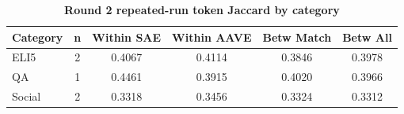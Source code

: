 \begin{table}[htbp]
\centering
\caption{\textbf{Round 2 repeated-run token Jaccard by category}}
\label{tab:round2-repeated-token-by-category}
\renewcommand{\arraystretch}{1.4}
\begin{tabular}{|l|c|c|c|c|c|}
\hline
\textbf{Category} & \textbf{n} & \textbf{Within SAE} & \textbf{Within AAVE} & \textbf{Betw Match} & \textbf{Betw All} \\
\hline
ELI5 & 2 & 0.4067 & 0.4114 & 0.3846 & 0.3978 \\
\hline
QA & 1 & 0.4461 & 0.3915 & 0.4020 & 0.3966 \\
\hline
Social & 2 & 0.3318 & 0.3456 & 0.3324 & 0.3312 \\
\hline
\end{tabular}
\end{table}
